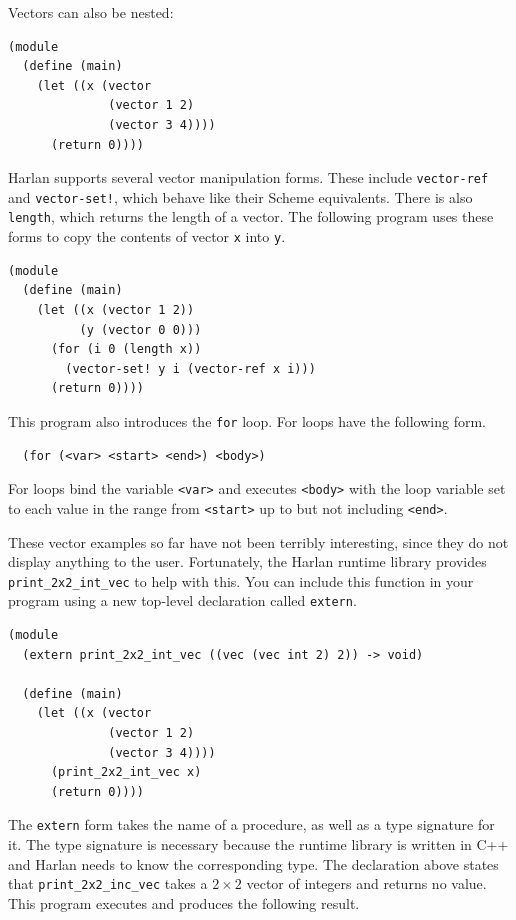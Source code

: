 \documentclass[oneside]{report}
\begin{document}
Vectors can also be nested:

\begin{lstlisting}
(module
  (define (main)
    (let ((x (vector
              (vector 1 2)
              (vector 3 4))))
      (return 0))))
\end{lstlisting}

Harlan supports several vector manipulation forms. These include
\lstinline{vector-ref} and \lstinline{vector-set!}, which behave like
their Scheme equivalents. There is also \lstinline{length}, which
returns the length of a vector. The following program uses these forms
to copy the contents of vector \lstinline{x} into \lstinline{y}.

\begin{lstlisting}
(module
  (define (main)
    (let ((x (vector 1 2))
          (y (vector 0 0)))
      (for (i 0 (length x))
        (vector-set! y i (vector-ref x i)))
      (return 0))))
\end{lstlisting}

This program also introduces the \lstinline{for} loop. For loops have
the following form.

\begin{lstlisting}
  (for (<var> <start> <end>) <body>)
\end{lstlisting}

For loops bind the variable \lstinline{<var>} and executes
\lstinline{<body>} with the loop variable set to each value in the
range from \lstinline{<start>} up to but not including
\lstinline{<end>}.

These vector examples so far have not been terribly interesting, since
they do not display anything to the user. Fortunately, the Harlan
runtime library provides \lstinline{print_2x2_int_vec} to help with
this. You can include this function in your program using a new
top-level declaration called \lstinline{extern}.

\begin{lstlisting}
(module
  (extern print_2x2_int_vec ((vec (vec int 2) 2)) -> void)
  
  (define (main)
    (let ((x (vector
              (vector 1 2)
              (vector 3 4))))
      (print_2x2_int_vec x)
      (return 0))))
\end{lstlisting}

The \lstinline{extern} form takes the name of a procedure, as well as
a type signature for it. The type signature is necessary because the
runtime library is written in C++ and Harlan needs to know the
corresponding type. The declaration above states that
\lstinline{print_2x2_inc_vec} takes a $2 \times 2$ vector of integers
and returns no value. This program executes and produces the following result.
\end{document}
